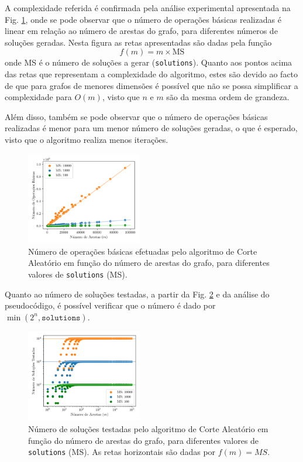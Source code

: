 \documentclass[mirror, portugues]{revdetua}
\begin{document}
A complexidade referida é confirmada pela análise experimental apresentada na Fig. \ref{fig:random_ops}, onde se pode observar que o número de operações básicas realizadas é linear em relação ao número de arestas do grafo, para diferentes números de soluções geradas. Nesta figura as retas apresentadas são dadas pela função $$f(m) = m \times \text{MS}$$ onde MS é o número de soluções a gerar (\texttt{solutions}). Quanto aos pontos acima das retas que representam a complexidade do algoritmo, estes são devido ao facto de que para grafos de menores dimensões é possível que não se possa simplificar a complexidade para $O(m)$, visto que $n$ e $m$ são da mesma ordem de grandeza.

Além disso, também se pode observar que o número de operações básicas realizadas é menor para um menor número de soluções geradas, o que é esperado, visto que o algoritmo realiza menos iterações.

\begin{figure}[H]
    \centering
    \includegraphics[width=0.45\textwidth]{../assets/ops_Random Sol.png}
    \caption{Número de operações básicas efetuadas pelo algoritmo de Corte Aleatório em função do número de arestas do grafo, para diferentes valores de \texttt{solutions} (MS).}
    \label{fig:random_ops}
\end{figure}

Quanto ao número de soluções testadas, a partir da Fig. \ref{fig:sols_randomrandom} e da análise do pseudocódigo, é possível verificar que o número é dado por $\min(2^n, \texttt{solutions})$.

\begin{figure}[H]
    \centering
    \includegraphics[width=0.45\textwidth]{../assets/sols_Random Sol.png}
    \caption{Número de soluções testadas pelo algoritmo de Corte Aleatório em função do número de arestas do grafo, para diferentes valores de \texttt{solutions} (MS). As retas horizontais são dadas por $f(m) = MS$.}
    \label{fig:sols_randomrandom}
\end{figure}
\end{document}

